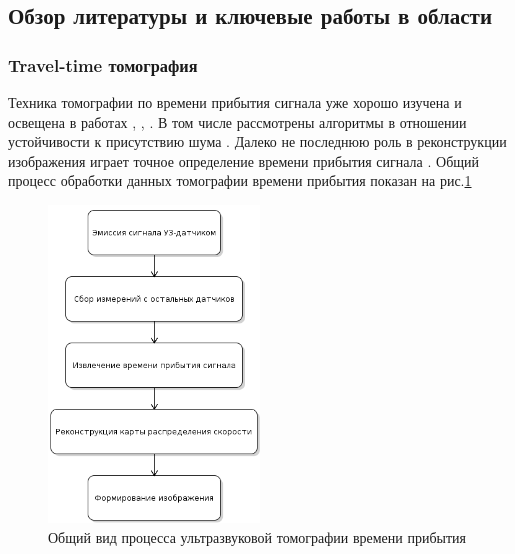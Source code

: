 \documentclass[14pt]{matmex-diploma}
\begin{document}
\subsection{Обзор литературы и ключевые работы в области}

\subsubsection{Travel-time томография} \label{sec:travel_times_descr}
Техника томографии по времени прибытия сигнала уже хорошо изучена и освещена в работах \cite{Kunyansky2012111}, \cite{quan2007sound}, \cite{hopp2014breast}. В том числе рассмотрены алгоритмы в отношении устойчивости к присутствию шума \cite{hormati2010robust}. Далеко не последнюю роль в реконструкции изображения играет точное определение времени прибытия сигнала \cite{li2009improved}. Общий процесс обработки данных томографии времени прибытия показан на рис.\ref{fig:us_process} \\

\begin{figure}[h]
\centering
    \includegraphics[width=0.5\textwidth]{pics/us_process.png}
    \caption{Общий вид процесса ультразвуковой томографии времени прибытия}
    \label{fig:us_process}
\end{figure}
\end{document}
